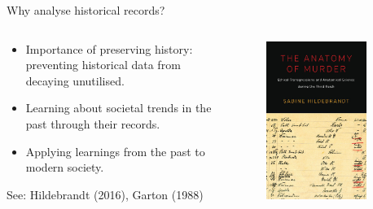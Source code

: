 \documentclass[]{beamer}
\begin{document}
\begin{frame}{Why analyse historical records?}
	\begin{columns}
		\begin{column}{0.6\textwidth}
			\begin{itemize}
				\item Importance of preserving history: preventing historical data from decaying unutilised.
				\item Learning about societal trends in the past through their records.
				\item Applying learnings from the past to modern society.
			\end{itemize}
			\vspace{1em}
			See: Hildebrandt (2016), Garton (1988)
		\end{column}
		\begin{column}{0.4\textwidth}
			\begin{figure}
				\includegraphics[width=0.85\textwidth]{img/anatomy_of_murder.jpeg}
			\end{figure}	
		\end{column}
	\end{columns}
\end{frame}
\end{document}

